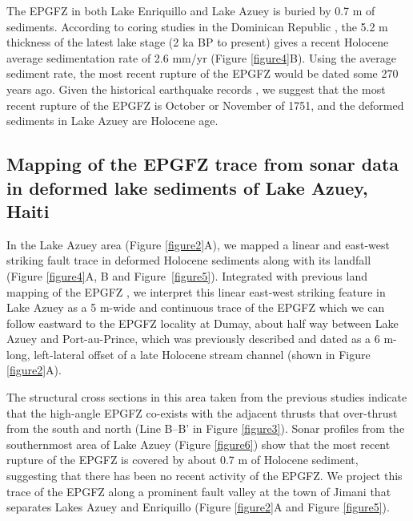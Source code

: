 \documentclass[linenumbers,draft]{agujournal}
\begin{document}
The EPGFZ in both Lake Enriquillo and Lake Azuey is buried by 0.7 m of sediments. According to coring studies in the Dominican Republic \citep{taylor1985stratigraphy,rios2013holocene}, the 5.2 m thickness of the latest lake stage (2 ka BP to present) gives a recent Holocene average sedimentation rate of 2.6 mm/yr (Figure \ref{figure4}B). Using the average sediment rate, the most recent rupture of the EPGFZ would be dated some 270 years ago. Given the historical earthquake records \citep{bakun2012significant}, we suggest that the most recent rupture of the EPGFZ is October or November of 1751, and the deformed sediments in Lake Azuey are Holocene age.

\subsection{Mapping of the EPGFZ trace from sonar data in deformed lake sediments of Lake Azuey, Haiti}
In the Lake Azuey area (Figure \ref{figure2}A), we mapped a linear and east-west striking fault trace in deformed Holocene sediments along with its landfall (Figure \ref{figure4}A, B and Figure~\ref{figure5}). Integrated with previous land mapping of the EPGFZ \citep{bourgueil1988synthese,mann1995actively,prentice2010seismic,cowgill2012interactive}, we interpret this linear east-west striking feature in Lake Azuey as a 5 m-wide and continuous trace of the EPGFZ which we can follow eastward to the EPGFZ locality at Dumay, about half way between Lake Azuey and Port-au-Prince, which was previously described and dated as a 6 m-long, left-lateral offset of a late Holocene stream channel \citep{cowgill2012interactive} (shown in Figure \ref{figure2}A). 

The structural cross sections in this area taken from the previous studies \citep{massoni1955haiti,mann1995actively,douilly2015three} indicate that the high-angle EPGFZ co-exists with the adjacent thrusts that over-thrust from the south and north (Line B--B' in Figure \ref{figure3}). Sonar profiles from the southernmost area of Lake Azuey (Figure \ref{figure6}) show that the most recent rupture of the EPGFZ is covered by about 0.7 m of Holocene sediment, suggesting that there has been no recent activity of the EPGFZ. We project this trace of the EPGFZ along a prominent fault valley at the town of Jimani that separates Lakes Azuey and Enriquillo (Figure \ref{figure2}A and Figure \ref{figure5}).
\end{document}
